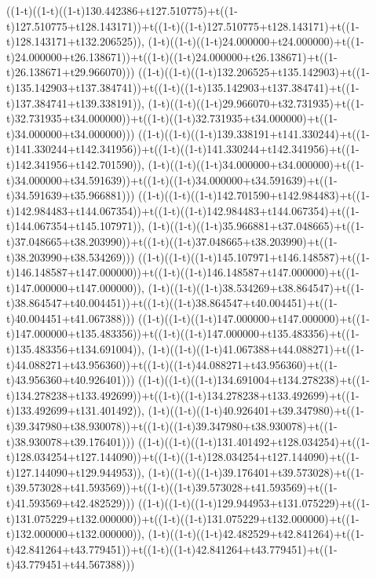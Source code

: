 ((1-t)((1-t)((1-t)130.442386+t127.510775)+t((1-t)127.510775+t128.143171))+t((1-t)((1-t)127.510775+t128.143171)+t((1-t)128.143171+t132.206525)),                                     (1-t)((1-t)((1-t)24.000000+t24.000000)+t((1-t)24.000000+t26.138671))+t((1-t)((1-t)24.000000+t26.138671)+t((1-t)26.138671+t29.966070)))
((1-t)((1-t)((1-t)132.206525+t135.142903)+t((1-t)135.142903+t137.384741))+t((1-t)((1-t)135.142903+t137.384741)+t((1-t)137.384741+t139.338191)),                                     (1-t)((1-t)((1-t)29.966070+t32.731935)+t((1-t)32.731935+t34.000000))+t((1-t)((1-t)32.731935+t34.000000)+t((1-t)34.000000+t34.000000)))
((1-t)((1-t)((1-t)139.338191+t141.330244)+t((1-t)141.330244+t142.341956))+t((1-t)((1-t)141.330244+t142.341956)+t((1-t)142.341956+t142.701590)),                                     (1-t)((1-t)((1-t)34.000000+t34.000000)+t((1-t)34.000000+t34.591639))+t((1-t)((1-t)34.000000+t34.591639)+t((1-t)34.591639+t35.966881)))
((1-t)((1-t)((1-t)142.701590+t142.984483)+t((1-t)142.984483+t144.067354))+t((1-t)((1-t)142.984483+t144.067354)+t((1-t)144.067354+t145.107971)),                                     (1-t)((1-t)((1-t)35.966881+t37.048665)+t((1-t)37.048665+t38.203990))+t((1-t)((1-t)37.048665+t38.203990)+t((1-t)38.203990+t38.534269)))
((1-t)((1-t)((1-t)145.107971+t146.148587)+t((1-t)146.148587+t147.000000))+t((1-t)((1-t)146.148587+t147.000000)+t((1-t)147.000000+t147.000000)),                                     (1-t)((1-t)((1-t)38.534269+t38.864547)+t((1-t)38.864547+t40.004451))+t((1-t)((1-t)38.864547+t40.004451)+t((1-t)40.004451+t41.067388)))
((1-t)((1-t)((1-t)147.000000+t147.000000)+t((1-t)147.000000+t135.483356))+t((1-t)((1-t)147.000000+t135.483356)+t((1-t)135.483356+t134.691004)),                                     (1-t)((1-t)((1-t)41.067388+t44.088271)+t((1-t)44.088271+t43.956360))+t((1-t)((1-t)44.088271+t43.956360)+t((1-t)43.956360+t40.926401)))
((1-t)((1-t)((1-t)134.691004+t134.278238)+t((1-t)134.278238+t133.492699))+t((1-t)((1-t)134.278238+t133.492699)+t((1-t)133.492699+t131.401492)),                                     (1-t)((1-t)((1-t)40.926401+t39.347980)+t((1-t)39.347980+t38.930078))+t((1-t)((1-t)39.347980+t38.930078)+t((1-t)38.930078+t39.176401)))
((1-t)((1-t)((1-t)131.401492+t128.034254)+t((1-t)128.034254+t127.144090))+t((1-t)((1-t)128.034254+t127.144090)+t((1-t)127.144090+t129.944953)),                                     (1-t)((1-t)((1-t)39.176401+t39.573028)+t((1-t)39.573028+t41.593569))+t((1-t)((1-t)39.573028+t41.593569)+t((1-t)41.593569+t42.482529)))
((1-t)((1-t)((1-t)129.944953+t131.075229)+t((1-t)131.075229+t132.000000))+t((1-t)((1-t)131.075229+t132.000000)+t((1-t)132.000000+t132.000000)),                                     (1-t)((1-t)((1-t)42.482529+t42.841264)+t((1-t)42.841264+t43.779451))+t((1-t)((1-t)42.841264+t43.779451)+t((1-t)43.779451+t44.567388)))
